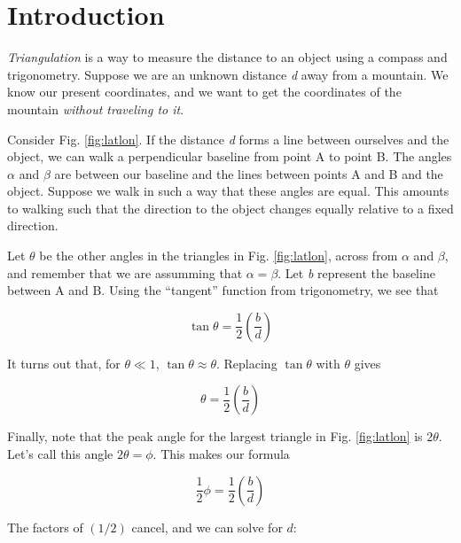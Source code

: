 \documentclass[12pt]{article}
\begin{document}
\twocolumn
\maketitle
\small

\section{Introduction}

\textit{Triangulation} is a way to measure the distance to an object using a compass and trigonometry.  Suppose we are an unknown distance \textit{d} away from a mountain.  We know our present coordinates, and we want to get the coordinates of the mountain \textit{without traveling to it}.

Consider Fig. \ref{fig:latlon}.  If the distance \textit{d} forms a line between ourselves and the object, we can walk a perpendicular baseline from point A to point B.  The angles $\alpha$ and $\beta$ are between our baseline and the lines between points A and B and the object.  Suppose we walk in such a way that these angles are equal.  This amounts to walking such that the direction to the object changes equally relative to a fixed direction.

Let $\theta$ be the other angles in the triangles in Fig. \ref{fig:latlon}, across from $\alpha$ and $\beta$, and remember that we are assumming that $\alpha = \beta$.  Let \textit{b} represent the baseline between A and B.  Using the ``tangent'' function from trigonometry, we see that

\begin{equation}
\tan\theta = \frac{1}{2}\left(\frac{b}{d}\right)
\end{equation}

It turns out that, for $\theta \ll 1$, $\tan\theta \approx \theta$.  Replacing $\tan\theta$ with $\theta$ gives

\begin{equation}
\theta = \frac{1}{2}\left(\frac{b}{d}\right)
\end{equation}

Finally, note that the peak angle for the largest triangle in Fig. \ref{fig:latlon} is $2\theta$.  Let's call this angle $2\theta = \phi$.  This makes our formula

\begin{equation}
\frac{1}{2}\phi = \frac{1}{2}\left(\frac{b}{d}\right)
\end{equation}

The factors of $(1/2)$ cancel, and we can solve for $d$:
\end{document}
